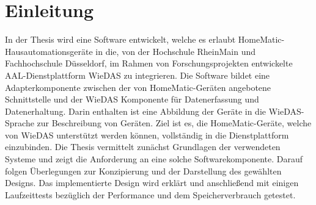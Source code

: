 \chapter{Einleitung}

In der Thesis wird eine Software entwickelt, welche es erlaubt HomeMatic-Hausautomationsgeräte
in die, von der Hochschule RheinMain und Fachhochschule Düsseldorf, im Rahmen von Forschungsprojekten
entwickelte AAL-Dienstplattform WieDAS zu integrieren.
Die Software bildet eine Adapterkomponente zwischen der von HomeMatic-Geräten angebotene Schnittstelle
und der WieDAS Komponente für Datenerfassung und Datenerhaltung.
Darin enthalten ist eine Abbildung der Geräte in die WieDAS-Sprache zur Beschreibung von Geräten.
Ziel ist es, die HomeMatic-Geräte, welche von WieDAS unterstützt werden können, vollständig in die
Dienstplattform einzubinden.
Die Thesis vermittelt zunächst Grundlagen der verwendeten Systeme und zeigt die Anforderung an eine
solche Softwarekomponente.
Darauf folgen Überlegungen zur Konzipierung und der Darstellung des gewählten Designs.
Das implementierte Design wird erklärt und anschließend mit einigen Laufzeittests bezüglich
der Performance und dem Speicherverbrauch getestet.
